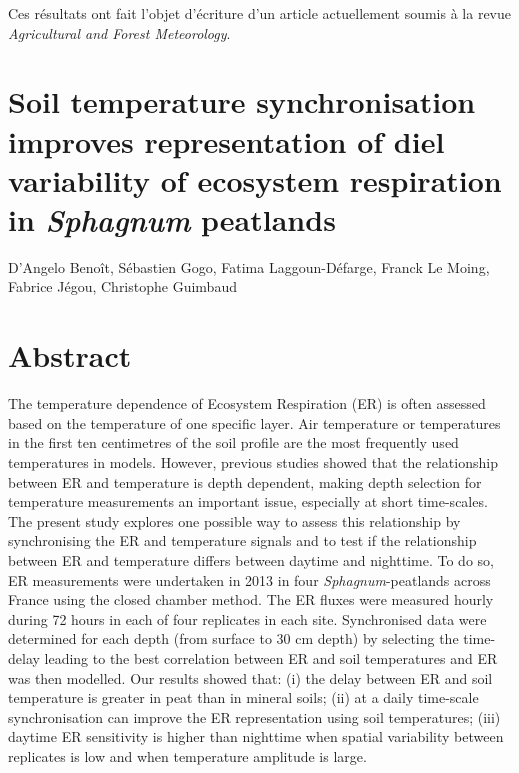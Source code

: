 Ces résultats ont fait l'objet d'écriture d'un article actuellement soumis à la revue \textit{Agricultural and Forest Meteorology}.

\singlespacing
\section*{Soil temperature synchronisation improves representation of diel variability of ecosystem respiration in \textit{Sphagnum} peatlands}
\doublespacing

{\large D'Angelo Benoît, Sébastien Gogo, Fatima Laggoun-Défarge, Franck Le Moing, Fabrice Jégou, Christophe Guimbaud}

\section{Abstract}

The temperature dependence of Ecosystem Respiration (ER) is often assessed based on the temperature of one specific layer.
Air temperature or temperatures in the first ten centimetres of the soil profile are the most frequently used temperatures in models.
However, previous studies showed that the relationship between ER and temperature is depth dependent, making depth selection for temperature measurements an important issue, especially at short time-scales.
The present study explores one possible way to assess this relationship by synchronising the ER and temperature signals and to test if the relationship between ER and temperature differs between daytime and nighttime.
To do so, ER measurements were undertaken in 2013 in four \textit{Sphagnum}-peatlands across France using the closed chamber method. 
The ER fluxes were measured hourly during 72 hours in each of four replicates in each site.
Synchronised data were determined for each depth (from surface to 30 cm depth) by selecting the time-delay leading to the best correlation between ER and soil temperatures and ER was then modelled.
Our results showed that: (i) the delay between ER and soil temperature is greater in peat than in mineral soils; (ii) at a daily time-scale synchronisation can improve the ER representation using soil temperatures; (iii) daytime ER sensitivity is higher than nighttime when spatial variability between replicates is low and when temperature amplitude is large.

